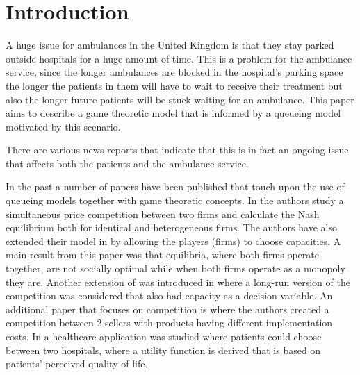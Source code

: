 \section{Introduction}



A huge issue for ambulances in the United Kingdom is that they stay 
parked outside hospitals for a huge amount of time. 
This is a problem for the ambulance service, since the longer ambulances are
blocked in the hospital's parking space the longer the patients in them will
have to wait to receive their treatment but also the longer future patients 
will be stuck waiting for an ambulance.
This paper aims to describe a game theoretic model that is informed by a 
queueing model motivated by this scenario.

There are various news reports that indicate that this is in fact an ongoing 
issue that affects both the patients and the ambulance service.

In the past a number of papers have been published that touch upon the use of 
queueing models together with game theoretic concepts.
In \cite{FirmCompetition} the authors study a simultaneous price competition 
between two firms and calculate the Nash equilibrium both for identical and 
heterogeneous firms. 
The authors have also extended their model in \cite{FirmCompetition2} by 
allowing the players (firms) to choose capacities. 
A main result from this paper was that equilibria, where both firms operate
together, are not socially optimal while when both firms operate as a monopoly 
they are.
Another extension of \cite{FirmCompetition} was introduced in 
\cite{FirmCompetitionExtension} where a long-run version of the competition was 
considered that also had capacity as a decision variable.
An additional paper that focuses on competition is \cite{fan2009short} where
the authors created a competition between 2 sellers with products having 
different implementation costs.
In \cite{sadat2015can} a healthcare application was studied where patients 
could choose between two hospitals, where a utility function is derived that is
based on patients' perceived quality of life.

